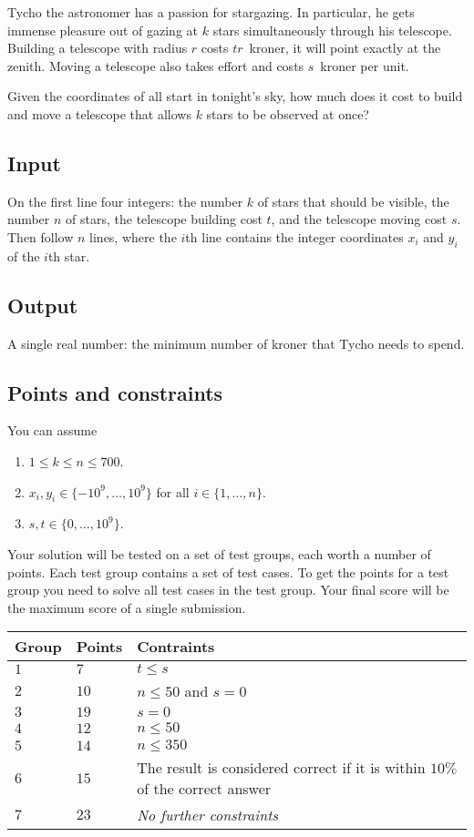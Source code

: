 
\noindent
Tycho the astronomer has a passion for stargazing.
In particular, he gets immense pleasure out of gazing at $k$ stars simultaneously through his telescope.   
Building a telescope with radius $r$ costs $tr$~kroner, it will point exactly at the zenith.
Moving a telescope also takes effort and costs $s$~kroner per unit.

Given the coordinates of all start in tonight's sky, how much does it cost to build and move a telescope that allows $k$ stars to be observed at once?

\subsection*{Input}

On the first line four integers: the number $k$ of stars that should be visible, the number $n$ of stars, the telescope building cost $t$, and the telescope moving cost $s$.
Then follow $n$ lines, where the $i$th line contains the integer coordinates $x_i$ and $y_i$ of the $i$th star.

\subsection*{Output}

A single real number: the minimum number of kroner that Tycho needs to spend.

\subsection*{Points and constraints}

You can assume 
\begin{enumerate}
\item $1\leq k\leq n\leq 700$. %
\item $x_i, y_i\in \{-10^9,\ldots, 10^9\}$ for all $i\in\{1,\ldots,n\}$. %
\item $s,t\in \{0,\ldots, 10^9\}$. %
\end{enumerate}

Your solution will be tested on a set of test groups, each worth a number of points.
Each test group contains a set of test cases.
To get the points for a test group you need to solve all test cases in the test group.
Your final score will be the maximum score of a single submission.

\medskip
\noindent
\begin{tabular}{lll}
  Group & Points & Contraints\\\hline
  $1$ & $7$ &  $t\leq s$\\
  $2$ & $10$ & $n\le 50$ and $s=0$\\
  $3$ & $19$ & $s=0$\\
  $4$ & $12$ & $n\leq 50$\\
  $5$ & $14$ & $n\leq 350$\\
  $6$ & $15$ & The result is considered correct if it is within $10\%$ of the correct answer\\
  $7$ & $23$ & \emph{No further constraints}\\
\end{tabular}
